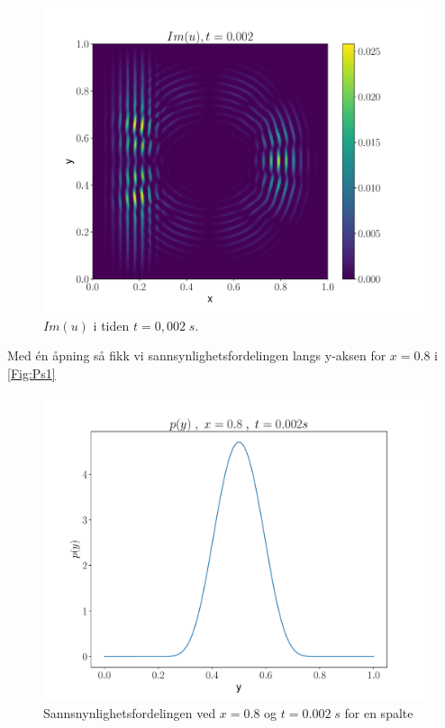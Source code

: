 \documentclass[reprint,english,notitlepage]{revtex4-2}  %
\begin{document}
\begin{figure}[H]
	\centering
	\includegraphics[scale=0.45, trim={3cm 0 0 0}]{../Images/ImshowIm0002sl2.pdf}
	\caption{$Im(u) $ i tiden $t = 0,002 \; s$.}
	\label{Fig:s2Imt02}
\end{figure}

Med én åpning så fikk vi sannsynlighetsfordelingen langs y-aksen for $x = 0.8$ i \autoref{Fig:Ps1}

\begin{figure}[H]
	\centering
	\includegraphics[scale=0.4]{../Images/ScreenProb1Slit.pdf}
	\caption{Sannsnynlighetsfordelingen ved $x = 0.8$ og $t = 0.002 \; s$ for en spalte}
	\label{Fig:Ps1}
\end{figure}
\end{document}
